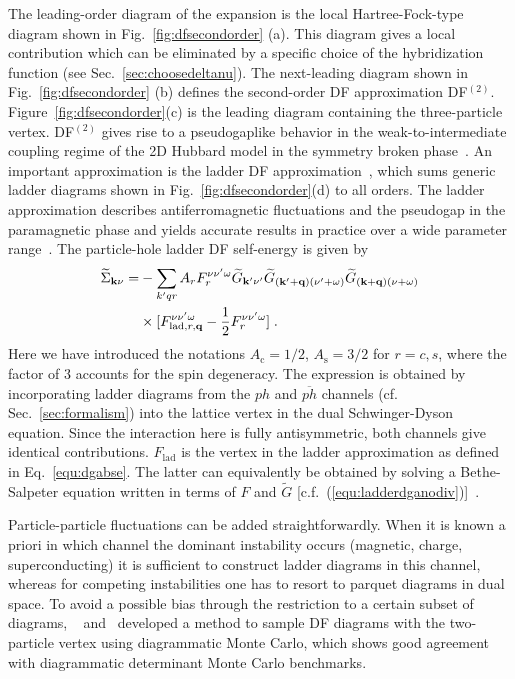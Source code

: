 \documentclass[rmp,aps,reprint,amsmath,amssymb,superscriptaddress,showpacs,nofootinbib]{revtex4-1}
\newcommand{\qv}{\ensuremath{\mathbf{q}}}
\begin{document}
The leading-order diagram of the expansion is the local Hartree-Fock-type diagram shown in Fig.~\ref{fig:dfsecondorder} (a). This diagram gives a local contribution which can be eliminated by a specific choice of the hybridization function (see Sec.~\ref{sec:choosedeltanu}). The next-leading diagram shown in Fig.~\ref{fig:dfsecondorder} (b) defines the second-order DF approximation DF$^{(2)}$. Figure~\ref{fig:dfsecondorder}(c) is the leading diagram containing the three-particle vertex. DF$^{(2)}$ gives rise to a pseudogaplike behavior in the weak-to-intermediate coupling regime of the 2D Hubbard model in the symmetry broken phase~\cite{Rubtsov2008}. An important approximation is the ladder DF approximation~\cite{Hafermann2009}, which sums generic ladder diagrams shown in Fig.~\ref{fig:dfsecondorder}(d) to all orders. The ladder approximation describes antiferromagnetic fluctuations and the pseudogap in the paramagnetic phase and yields accurate results in practice over a wide parameter range~\cite{Gukelberger2016}. The particle-hole ladder DF self-energy is given by
\begin{align}
  \widetilde{\Sigma}_{\mathbf{k}\nu} =& - \sum_{k'q r} A_r F_{r}^{\nu\nu'\omega}\widetilde{G}_{\mathbf{k}'\nu'}\widetilde{G}_{(\mathbf{k}'+\qv)(\nu'+\omega)}\widetilde{G}_{(\mathbf{k}+\qv)(\nu+\omega)}\notag\\
  &\times[F_{\text{lad},r,\qv}^{\nu\nu'\omega}-\frac{1}{2}F_{r}^{\nu\nu'\omega}] \; .
\label{eq:sigmadf}
\end{align}
Here we have introduced the notations $A_\text{c}=1/2$, $A_\text{s}=3/2$ for $r=c,s$, where the factor of $3$ accounts for the spin degeneracy. The expression is obtained by incorporating ladder diagrams from the $ph$ and $\overline{ph}$ channels (cf. Sec.~\ref{sec:formalism}) into the lattice vertex in the dual Schwinger-Dyson equation. Since the interaction here is fully antisymmetric, both channels give identical contributions. $F_{\text{lad}}$ is the vertex in the ladder approximation as defined in Eq.~\eqref{equ:dgabse}. The latter can equivalently be obtained by solving a Bethe-Salpeter equation written in terms of $F$ and $\widetilde{G}$ [c.f.~(\ref{equ:ladderdganodiv})]~\cite{Brener08}.

Particle-particle fluctuations can be added straightforwardly. When it is known a priori in which channel the dominant instability occurs (magnetic, charge, superconducting) it is sufficient to construct ladder diagrams in this channel, whereas for competing instabilities one has to resort to parquet diagrams in dual space. To avoid a possible bias through the restriction to a certain subset of diagrams, ~ and~ developed a method to sample DF diagrams with the two-particle vertex using diagrammatic Monte Carlo, which shows good agreement with diagrammatic determinant Monte Carlo benchmarks. 
\end{document}
